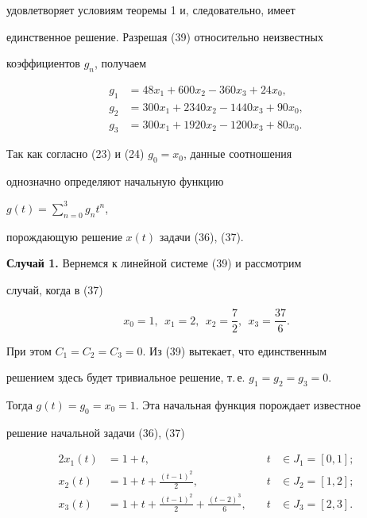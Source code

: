 \begin{exam}
удовлетворяет условиям теоремы 1 и, следовательно, имеет


единственное решение. Разрешая (39) относительно неизвестных


коэффициентов $g_n$, получаем


\begin{align*}


g_1 &= 48x_1+600x_2-360x_3+24x_0, \\


g_2 &= 300x_1+2340x_2-1440x_3+90x_0, \\


g_3 &= 300x_1+1920x_2-1200x_3+80x_0.


\end{align*}


Так как согласно (23) и (24) $g_0=x_0$, данные соотношения


однозначно определяют начальную функцию


$g(t)=\sum\limits_{n=0}^3g_nt^n$,


порождающую решение $x(t)$ задачи (36), (37).


\medskip





{\bf Случай 1.} Вернемся к линейной системе (39) и рассмотрим


случай, когда в (37)


$$ 


x_0=1,\ \ x_1=2,\ \ x_2=\frac{7}{2},\ \ x_3=\frac{37}{6}.


$$


При этом $C_1=C_2=C_3=0$. Из (39) вытекает, что единственным


решением здесь будет тривиальное решение, т.\,е. $g_1=g_2=g_3=0$.


Тогда $g(t)=g_0=x_0=1$. Эта начальная функция порождает известное


решение начальной задачи (36), (37)


\begin{alignat*}{2}


x_1(t) &= 1+t, & \quad t&\in J_1=[0,1]; \\


x_2(t) &= 1+t+ \frac{(t-1)^2}{2}, &\quad t&\in J_2=[1,2]; \\


x_3(t) &= 1+t+ \frac{(t-1)^2}{2}+\frac{(t-2)^3}{6},


&\quad t&\in J_3=[2,3].


\end{alignat*}



\end{exam}
